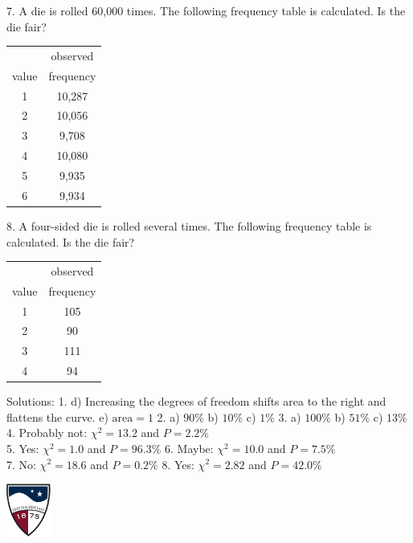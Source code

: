 \documentclass[10pt]{article}
\newcommand{\Z}{\hphantom{0}}
\begin{document}
7. A die is rolled 60,000 times.  The following frequency table is calculated.
Is the die fair? 

\begin{tabular}{|c|c|}\hline
      & observed\\
value & frequency\\\hline
1 & 10,287\\
2 & 10,056\\
3 & \Z9,708\\
4 & 10,080\\
5 & \Z9,935\\
6 & \Z9,934\\\hline
\end{tabular}
\bigskip

8. A four-sided die is rolled several times.  
The following frequency table is calculated. Is the die fair? 

\begin{tabular}{|c|c|}\hline
      & observed\\
value & frequency\\\hline
1 & 105\\
2 & \Z90\\
3 & 111\\
4 & \Z94\\\hline
\end{tabular}

\vfill
Solutions: 1. d) Increasing the degrees of freedom shifts area to the right and 
   flattens the curve. e) $\mbox{area}=1$ \hspace{20pt} 
2. a) $90\%$ b) $10\%$ c) $1\%$ \hspace{20pt} 
3. a) $100\%$ b) $51\%$ c) $13\%$ \hspace{20pt} 
4. Probably not: $\chi^2=13.2$ and $P=2.2\%$\\ %
5. Yes: $\chi^2=1.0$ and $P=96.3\%$ \hspace{20pt}
6. Maybe: $\chi^2=10.0$ and $P=7.5\%$ \hspace{20pt}\\
7. No: $\chi^2=18.6$ and $P=0.2\%$ \hspace{20pt}
8. Yes: $\chi^2=2.82$ and $P=42.0\%$ \hspace{20pt}
\eject

\href{http://www.su.edu}{\includegraphics[height=1.75cm]{sulogo.eps}}
\vspace{-1.79cm}
\end{document}
